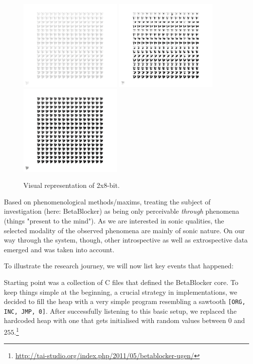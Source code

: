 \documentclass[letterpaper, 12pt]{article}
\begin{document}
\begin{figure}
	\centering
		\includegraphics[width=2in]{binaryRepresentation-01}
		\includegraphics[width=2in]{binaryRepresentation-02}
		\includegraphics[width=2in]{binaryRepresentation-03}
	\caption{Visual representation of 2x8-bit.}
	\label{fig:fig_2013-heapIris-white}
\end{figure}

Based on phenomenological methods/maxims, treating the subject of investigation (here: BetaBlocker) as being only perceivable \emph{through} phenomena (things "present to the mind"). 
As we are interested in sonic qualities, the selected modality of the observed phenomena are mainly of sonic nature.
On our way through the system, though, other introspective as well as extrospective data emerged and was taken into account.

To illustrate the research journey, we will now list key events that happened:

Starting point was a collection of C files that defined the BetaBlocker core.
To keep things simple at the beginning, a crucial strategy in implementations, we decided to fill the heap with a very simple program resembling a sawtooth \verb#[ORG, INC, JMP, 0]#. 
After successfully listening to this basic setup, we replaced the hardcoded heap with one that gets initialised with random values between $0$ and $255$.\footnote{\url{http://tai-studio.org/index.php/2011/05/betablocker-ugen/}}
\end{document}
